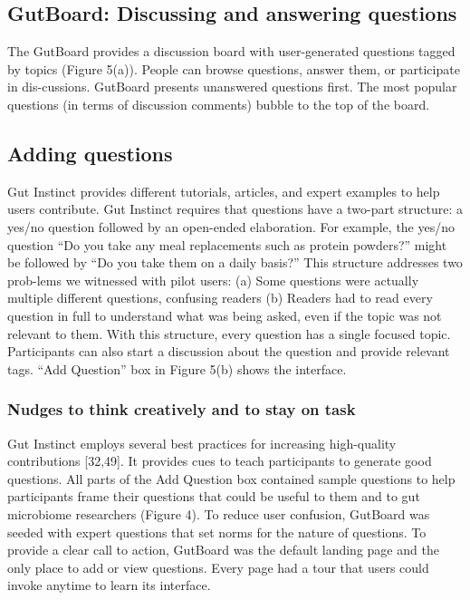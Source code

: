 \subsection{GutBoard: Discussing and answering questions}
The GutBoard provides a discussion board with user-generated questions tagged by topics (Figure 5(a)). People can browse questions, answer them, or participate in dis-cussions. GutBoard presents unanswered questions first. The most popular questions (in terms of discussion comments) bubble to the top of the board.
 
\subsection{Adding questions}
Gut Instinct provides different tutorials, articles, and expert examples to help users contribute. Gut Instinct requires that questions have a two-part structure: a yes/no question followed by an open-ended elaboration. For example, the yes/no question “Do you take any meal replacements such as protein powders?” might be followed by “Do you take them on a daily basis?” This structure addresses two prob-lems we witnessed with pilot users: (a) Some questions were actually multiple different questions, confusing readers (b) Readers had to read every question in full to understand what was being asked, even if the topic was not relevant to them. With this structure, every question has a single focused topic. Participants can also start a discussion about the question and provide relevant tags. “Add Question” box in Figure 5(b) shows the interface. 

\subsubsection{Nudges to think creatively and to stay on task}
Gut Instinct employs several best practices for increasing high-quality contributions [32,49]. It provides cues to teach participants to generate good questions. All parts of the Add Question box contained sample questions to help participants frame their questions that could be useful to them and to gut microbiome researchers (Figure 4). To reduce user confusion, GutBoard was seeded with expert questions that set norms for the nature of questions. To provide a clear call to action, GutBoard was the default landing page and the only place to add or view questions. Every page had a tour that users could invoke anytime to learn its interface.

